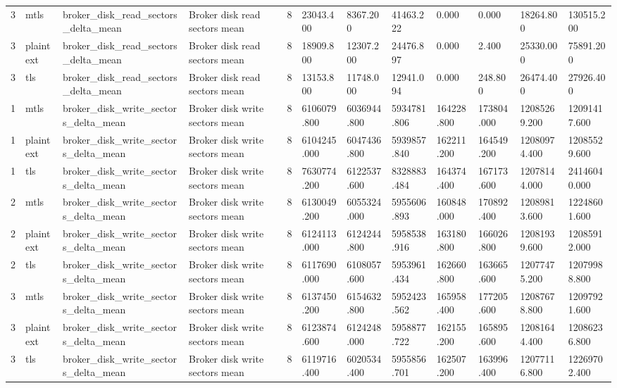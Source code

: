\begin{longtable}{llllllllllll}
3 & mtls & broker\_disk\_read\_sectors\_delta\_mean & Broker disk read sectors mean & 8 & 23043.400 & 8367.200 & 41463.222 & 0.000 & 0.000 & 18264.800 & 130515.200 \\
3 & plaintext & broker\_disk\_read\_sectors\_delta\_mean & Broker disk read sectors mean & 8 & 18909.800 & 12307.200 & 24476.897 & 0.000 & 2.400 & 25330.000 & 75891.200 \\
3 & tls & broker\_disk\_read\_sectors\_delta\_mean & Broker disk read sectors mean & 8 & 13153.800 & 11748.000 & 12941.094 & 0.000 & 248.800 & 26474.400 & 27926.400 \\
1 & mtls & broker\_disk\_write\_sectors\_delta\_mean & Broker disk write sectors mean & 8 & 6106079.800 & 6036944.800 & 5934781.806 & 164228.800 & 173804.000 & 12085269.200 & 12091417.600 \\
1 & plaintext & broker\_disk\_write\_sectors\_delta\_mean & Broker disk write sectors mean & 8 & 6104245.000 & 6047436.800 & 5939857.840 & 162211.200 & 164549.200 & 12080974.400 & 12085529.600 \\
1 & tls & broker\_disk\_write\_sectors\_delta\_mean & Broker disk write sectors mean & 8 & 7630774.200 & 6122537.600 & 8328883.484 & 164374.400 & 167173.600 & 12078144.000 & 24146040.000 \\
2 & mtls & broker\_disk\_write\_sectors\_delta\_mean & Broker disk write sectors mean & 8 & 6130049.200 & 6055324.000 & 5955606.893 & 160848.000 & 170892.400 & 12089813.600 & 12248601.600 \\
2 & plaintext & broker\_disk\_write\_sectors\_delta\_mean & Broker disk write sectors mean & 8 & 6124113.000 & 6124244.800 & 5958538.916 & 163180.800 & 166026.800 & 12081939.600 & 12085912.000 \\
2 & tls & broker\_disk\_write\_sectors\_delta\_mean & Broker disk write sectors mean & 8 & 6117690.000 & 6108057.600 & 5953961.434 & 162660.800 & 163665.600 & 12077475.200 & 12079988.800 \\
3 & mtls & broker\_disk\_write\_sectors\_delta\_mean & Broker disk write sectors mean & 8 & 6137450.200 & 6154632.800 & 5952423.562 & 165958.400 & 177205.600 & 12087678.800 & 12097921.600 \\
3 & plaintext & broker\_disk\_write\_sectors\_delta\_mean & Broker disk write sectors mean & 8 & 6123874.600 & 6124248.000 & 5958877.722 & 162155.200 & 165895.600 & 12081644.400 & 12086236.800 \\
3 & tls & broker\_disk\_write\_sectors\_delta\_mean & Broker disk write sectors mean & 8 & 6119716.400 & 6020534.400 & 5955856.701 & 162507.200 & 163996.400 & 12077116.800 & 12269702.400 \\
\hline
\end{longtable}
